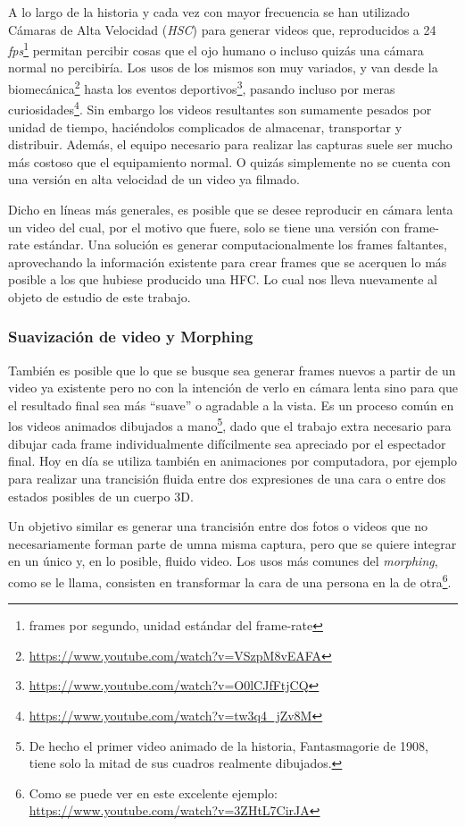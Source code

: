 A lo largo de la historia y cada vez con mayor frecuencia se han utilizado Cámaras de Alta Velocidad (\emph{HSC}) para generar videos que, reproducidos a 24 \emph{fps}\footnote{frames por segundo, unidad estándar del frame-rate} permitan percibir cosas que el ojo humano o incluso quizás una cámara normal no percibiría. Los usos de los mismos son muy variados, y van desde la biomecánica\footnote{\url{https://www.youtube.com/watch?v=VSzpM8vEAFA}} hasta los eventos deportivos\footnote{\url{https://www.youtube.com/watch?v=O0lCJfFtjCQ}}, pasando incluso por meras curiosidades\footnote{\url{https://www.youtube.com/watch?v=tw3q4_jZv8M}}. Sin embargo los videos resultantes son sumamente pesados por unidad de tiempo, haciéndolos complicados de almacenar, transportar y distribuir. Además, el equipo necesario para realizar las capturas suele ser mucho más costoso que el equipamiento normal. O quizás simplemente no se cuenta con una versión en alta velocidad de un video ya filmado.

Dicho en líneas más generales, es posible que se desee reproducir en cámara lenta un video del cual, por el motivo que fuere, solo se tiene una versión con frame-rate estándar. Una solución es generar computacionalmente los frames faltantes, aprovechando la información existente para crear frames que se acerquen lo más posible a los que hubiese producido una HFC. Lo cual nos lleva nuevamente al objeto de estudio de este trabajo.

\subsubsection{Suavización de video y Morphing}
También es posible que lo que se busque sea generar frames nuevos a partir de un video ya existente pero no con la intención de verlo en cámara lenta sino para que el resultado final sea más ``suave'' o agradable a la vista. Es un proceso común en los videos animados dibujados a mano\footnote{De hecho el primer video animado de la historia, Fantasmagorie de 1908, tiene solo la mitad de sus cuadros realmente dibujados.}, dado que el trabajo extra necesario para dibujar cada frame individualmente difícilmente sea apreciado por el espectador final. Hoy en día se utiliza también en animaciones por computadora, por ejemplo para realizar una trancisión fluida entre dos expresiones de una cara o entre dos estados posibles de un cuerpo 3D.

Un objetivo similar es generar una trancisión entre dos fotos o videos que no necesariamente forman parte de umna misma captura, pero que se quiere integrar en un único y, en lo posible, fluido video. Los usos más comunes del \emph{morphing}, como se le llama, consisten en transformar la cara de una persona en la de otra\footnote{Como se puede ver en este excelente ejemplo: \url{https://www.youtube.com/watch?v=3ZHtL7CirJA}}.